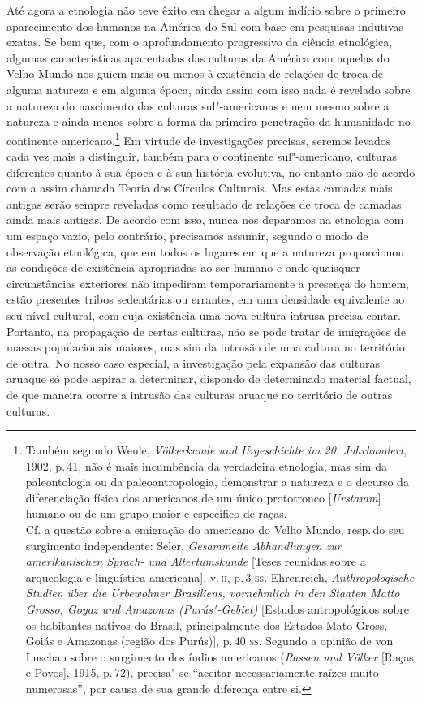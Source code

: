 Até agora a etnologia não teve êxito em chegar a algum indício sobre o
primeiro aparecimento dos humanos na América do Sul com base em
pesquisas indutivas exatas. Se bem que, com o aprofundamento progressivo
da ciência etnológica, algumas características aparentadas das culturas
da América com aquelas do Velho Mundo nos guiem mais ou menos à
existência de relações de troca de alguma natureza e em alguma época,
ainda assim com isso nada é revelado sobre a natureza do nascimento das
culturas sul"-americanas e nem mesmo sobre a natureza e ainda menos sobre
a forma da primeira penetração da humanidade no continente
americano.\footnote{Também segundo Weule, \textit{Völkerkunde und
  Urgeschichte im 20. Jahrhundert}, 1902, p.\,41, não é mais incumbência
  da verdadeira etnologia, mas sim da paleontologia ou da
  paleoantropologia, demonstrar a natureza e o decurso da diferenciação
  física dos americanos de um único prototronco {[}\textit{Urstamm}{]}
  humano ou de um grupo maior e específico de raças.\\
  Cf. a questão sobre a emigração do americano do Velho Mundo, resp.\,do
  seu surgimento independente: Seler, \textit{Gesammelte Abhandlungen zur
  amerikanischen Sprach- und Altertumskunde} {[}Teses reunidas sobre a
  arqueologia e linguística americana{]}, v.\,\textsc{ii}, p.\,3 \textsc{ss}. Ehrenreich,
  \textit{Anthropologische Studien über die Urbewohner Brasiliens,
  vornehmlich in den Staaten Matto Grosso, Goyaz und Amazonas
  (Purús"-Gebiet)} {[}Estudos antropológicos sobre os habitantes nativos
  do Brasil, principalmente dos Estados Mato Gross, Goiás e Amazonas
  (região dos Purús){]}, p.\,40 \textsc{ss}. Segundo a opinião de von Luschan
  sobre o surgimento dos índios americanos (\textit{Rassen und Völker}
  {[}Raças e Povos{]}, 1915, p.\,72), precisa"-se ``aceitar
  necessariamente raízes muito numerosas'', por causa de sua grande
  diferença entre si.} Em virtude de investigações precisas, seremos levados
cada vez mais a distinguir, também para o continente sul"-americano,
culturas diferentes quanto à sua época e à sua história evolutiva, no
entanto não de acordo com a assim chamada Teoria dos Círculos
Culturais. Mas estas camadas mais antigas serão sempre reveladas como
resultado de relações de troca de camadas ainda mais antigas. De acordo
com isso, nunca nos deparamos na etnologia com um espaço vazio, pelo
contrário, precisamos assumir, segundo o modo de observação etnológica,
que em todos os lugares em que a natureza proporcionou as condições de
existência apropriadas ao ser humano e onde quaisquer circunstâncias
exteriores não impediram temporariamente a presença do homem, estão
presentes tribos sedentárias ou errantes, em uma densidade equivalente
ao seu nível cultural, com cuja existência uma nova cultura intrusa
precisa contar. Portanto, na propagação de certas culturas, não se pode
tratar de imigrações de massas populacionais maiores, mas sim da
intrusão de uma cultura no território de outra. No nosso caso especial,
a investigação pela expansão das culturas aruaque só pode aspirar a
determinar, dispondo de determinado material factual, de que maneira
ocorre a intrusão das culturas aruaque no território de outras
culturas.

